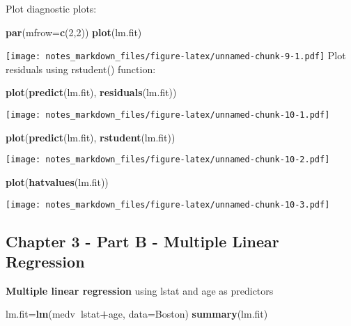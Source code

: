 \documentclass[]{article}
\newenvironment{Shaded}{\begin{snugshade}}{\end{snugshade}}
\newcommand{\KeywordTok}[1]{\textcolor[rgb]{0.13,0.29,0.53}{\textbf{#1}}}
\newcommand{\DataTypeTok}[1]{\textcolor[rgb]{0.13,0.29,0.53}{#1}}
\newcommand{\DecValTok}[1]{\textcolor[rgb]{0.00,0.00,0.81}{#1}}
\newcommand{\OperatorTok}[1]{\textcolor[rgb]{0.81,0.36,0.00}{\textbf{#1}}}
\newcommand{\NormalTok}[1]{#1}
\begin{document}
Plot diagnostic plots:

\begin{Shaded}
\begin{Highlighting}[]
\KeywordTok{par}\NormalTok{(}\DataTypeTok{mfrow=}\KeywordTok{c}\NormalTok{(}\DecValTok{2}\NormalTok{,}\DecValTok{2}\NormalTok{))}
\KeywordTok{plot}\NormalTok{(lm.fit)}
\end{Highlighting}
\end{Shaded}

\texttt{[image: notes\_markdown\_files/figure-latex/unnamed-chunk-9-1.pdf]}
Plot residuals using rstudent() function:

\begin{Shaded}
\begin{Highlighting}[]
\KeywordTok{plot}\NormalTok{(}\KeywordTok{predict}\NormalTok{(lm.fit), }\KeywordTok{residuals}\NormalTok{(lm.fit))}
\end{Highlighting}
\end{Shaded}

\texttt{[image: notes\_markdown\_files/figure-latex/unnamed-chunk-10-1.pdf]}

\begin{Shaded}
\begin{Highlighting}[]
\KeywordTok{plot}\NormalTok{(}\KeywordTok{predict}\NormalTok{(lm.fit), }\KeywordTok{rstudent}\NormalTok{(lm.fit))}
\end{Highlighting}
\end{Shaded}

\texttt{[image: notes\_markdown\_files/figure-latex/unnamed-chunk-10-2.pdf]}

\begin{Shaded}
\begin{Highlighting}[]
\KeywordTok{plot}\NormalTok{(}\KeywordTok{hatvalues}\NormalTok{(lm.fit))}
\end{Highlighting}
\end{Shaded}

\texttt{[image: notes\_markdown\_files/figure-latex/unnamed-chunk-10-3.pdf]}

\subsection{Chapter 3 - Part B - Multiple Linear
Regression}\label{chapter-3---part-b---multiple-linear-regression}

\textbf{Multiple linear regression} using lstat and age as predictors

\begin{Shaded}
\begin{Highlighting}[]
\NormalTok{lm.fit=}\KeywordTok{lm}\NormalTok{(medv}\OperatorTok{~}\NormalTok{lstat}\OperatorTok{+}\NormalTok{age, }\DataTypeTok{data=}\NormalTok{Boston)}
\KeywordTok{summary}\NormalTok{(lm.fit)}
\end{Highlighting}
\end{Shaded}
\end{document}
